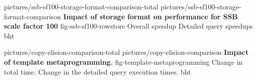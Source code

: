 %
%
%

\twoabfigures
{pictures/ssb-sf100-storage-format-comparison-total}
{pictures/ssb-sf100-storage-format-comparison}
{\textbf{Impact of storage format on performance for SSB scale factor 100\vspace*{3em}}}
{fig-ssb-sf100-rowstore}
{Overall speedup}
{Detailed query speedups}
{bht}

\twoabfigures
{pictures/copy-elision-comparison-total}
{pictures/copy-elision-comparison}
{\textbf{Impact of template metaprogramming.}}
{fig-template-metaprogramming}
{Change in total time.}
{Change in the detailed query execution times.}
{bht}

